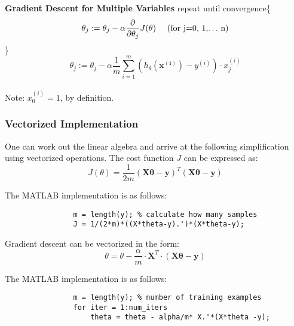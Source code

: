         
                \textbf{Gradient Descent for Multiple Variables}
                        repeat until convergence\{  
                            \[ \theta_j := \theta_j - \alpha \frac{\partial }{\partial \theta_j} J(\mathbf{\theta})\mbox{\hspace{10pt} (for j=0, 1,$\ldots$ n)}  
                            \] 
                        \}  \\


                        
                       \[\theta_j := \theta_j - \alpha \frac{1}{m} \sum_{i=1}^{m} (h_\theta(\mathbf{x^{(i)}}) - y^{(i)} ) \cdot x_j^{(i)}\] \\ 
                       
                       Note: $x_0^{(i)} = 1$, by definition.
        
         \subsubsection{Vectorized Implementation}

         One can work out the linear algebra and arrive at the following simplification using vectorized operations.
            The cost function $J$ can be expressed as:
            \begin{equation}
                J(\theta) = \frac{1}{2m} (\mathbf{X\theta} - \mathbf{y})^T (\mathbf{X\theta} - \mathbf{y} )
                \label{eq:vectorized-cost}
            \end{equation}
            
            The MATLAB implementation is as follows:
            \begin{lstlisting}
                m = length(y); % calculate how many samples 
                J = 1/(2*m)*((X*theta-y).')*(X*theta-y);

            \end{lstlisting}


            Gradient descent can be vectorized in the form:
            \begin{equation}
                \theta = \theta - \frac{\alpha}{m} \cdot \mathbf{X}^T \cdot (\mathbf{X\theta} - \mathbf{y}) 
                \label{eq:vectorized-gradient-descent}
            \end{equation}

            The MATLAB implementation is as follows:
            \begin{lstlisting}
                m = length(y); % number of training examples
                for iter = 1:num_iters
                    theta = theta - alpha/m* X.'*(X*theta -y);
            \end{lstlisting}


